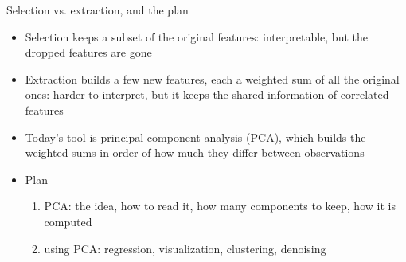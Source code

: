 \begin{frame}{Selection vs. extraction, and the plan}
    \begin{itemize}
        \item Selection keeps a subset of the original features: interpretable, but the dropped features are gone
        \item Extraction builds a few new features, each a weighted sum of all the original ones: harder to interpret, but it keeps the shared information of correlated features
        \item Today's tool is principal component analysis (PCA), which builds the weighted sums in order of how much they differ between observations
        \item Plan
            \begin{enumerate}
                \item PCA: the idea, how to read it, how many components to keep, how it is computed
                \item using PCA: regression, visualization, clustering, denoising
            \end{enumerate}
    \end{itemize}
\end{frame}


